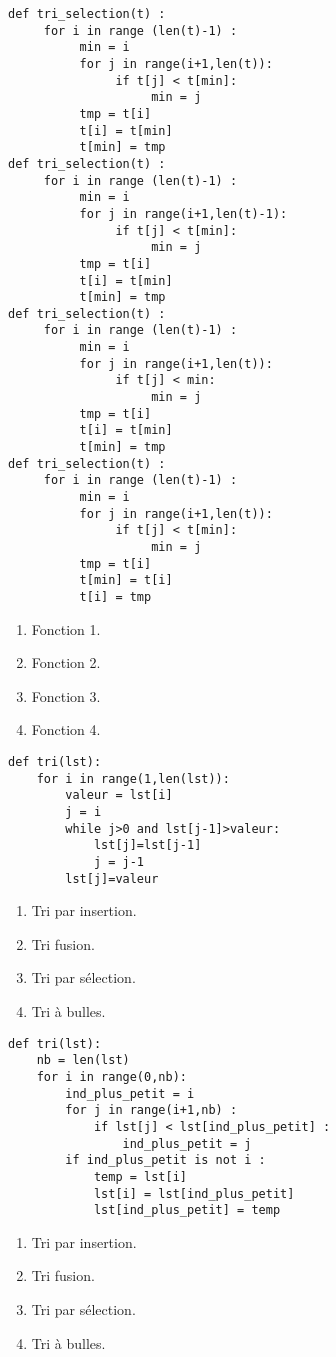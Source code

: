\begin{lstlisting}
def tri_selection(t) :
     for i in range (len(t)-1) :
          min = i		
          for j in range(i+1,len(t)):
               if t[j] < t[min]:
                    min = j
          tmp = t[i]
          t[i] = t[min]
          t[min] = tmp
def tri_selection(t) :
     for i in range (len(t)-1) :
          min = i		
          for j in range(i+1,len(t)-1):
               if t[j] < t[min]:
                    min = j
          tmp = t[i]
          t[i] = t[min]
          t[min] = tmp
def tri_selection(t) :
     for i in range (len(t)-1) :
          min = i		
          for j in range(i+1,len(t)):
               if t[j] < min:
                    min = j
          tmp = t[i]
          t[i] = t[min]
          t[min] = tmp
def tri_selection(t) :
     for i in range (len(t)-1) :
          min = i		
          for j in range(i+1,len(t)):
               if t[j] < t[min]:
                    min = j
          tmp = t[i]
          t[min] = t[i]
          t[i] = tmp
\end{lstlisting}
\begin{enumerate}
\item Fonction 1. %
\item Fonction 2.
\item Fonction 3.
\item Fonction 4.
\end{enumerate}

\begin{lstlisting}
def tri(lst):
    for i in range(1,len(lst)):
        valeur = lst[i]
        j = i
        while j>0 and lst[j-1]>valeur:
            lst[j]=lst[j-1]
            j = j-1
        lst[j]=valeur
\end{lstlisting}
\begin{enumerate}
\item Tri par insertion. %
\item Tri fusion.
\item Tri par sélection.
\item Tri à bulles.
\end{enumerate}

\begin{lstlisting}
def tri(lst):
    nb = len(lst)
    for i in range(0,nb):    
        ind_plus_petit = i
        for j in range(i+1,nb) :
            if lst[j] < lst[ind_plus_petit] :
                ind_plus_petit = j
        if ind_plus_petit is not i :
            temp = lst[i]
            lst[i] = lst[ind_plus_petit]
            lst[ind_plus_petit] = temp
\end{lstlisting}
\begin{enumerate}
\item Tri par insertion. 
\item Tri fusion.
\item Tri par sélection. %
\item Tri à bulles.
\end{enumerate}

